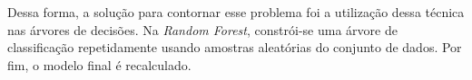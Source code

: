 
Dessa forma, a solução para contornar esse problema foi a utilização dessa técnica nas árvores de decisões. Na \emph{Random Forest}, constrói-se uma árvore de classificação repetidamente usando amostras aleatórias do conjunto de dados. Por fim, o modelo final é recalculado.
